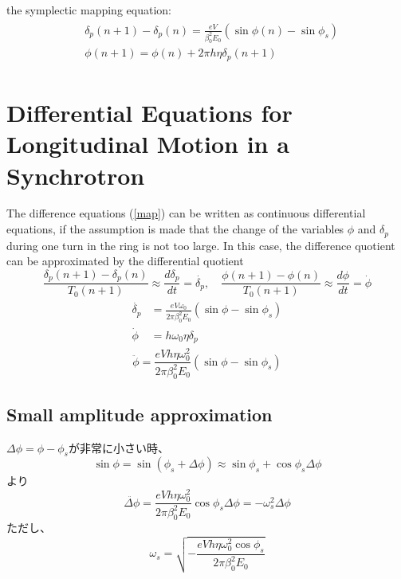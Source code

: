 \documentclass[10pt,a4paper]{ltjsarticle}
\begin{document}
the symplectic mapping equation:
%
\begin{align}
    \begin{split}
        &\delta_p(n+1) - \delta_p(n) = \frac{e V}{\beta_0^2 E_0}(\sin\phi(n) -\sin\phi_s) \\
        &\phi(n+1) = \phi(n) + 2\pi h \eta \delta_p(n+1)
        \label{map}
    \end{split}
\end{align}
%

\section{Differential Equations for Longitudinal Motion in a Synchrotron}
The difference equations (\ref{map}) can be written as continuous differential equations, if the assumption is made that the change of the variables $\phi$ and $\delta_p$ during one turn in the ring is not too large. In this case, the difference quotient can be approximated by the differential quotient
%
\begin{equation}
    \frac{\delta_p(n+1)-\delta_p(n)}{T_0(n+1)} \approx \frac{d\delta_p}{dt}=\dot{\delta_p},\quad 
    \frac{\phi(n+1)-\phi(n)}{T_0(n+1)} \approx \frac{d\phi}{dt}= \dot{\phi}
\end{equation}
%
\begin{align}
    \begin{split}
        \dot{\delta_p} &= \frac{e V \omega_0}{2\pi \beta_0^2 E_0}(\sin\phi - \sin\phi_s) \\
        \dot{\phi} &= h \omega_0 \eta \delta_p
    \end{split}
\end{align}
%
\begin{equation}
    \ddot{\phi} = \frac{e V h \eta \omega_0^2}{2\pi\beta_0^2 E_0}(\sin\phi-\sin\phi_s)
\end{equation}
%
\subsection{Small amplitude approximation}
$\Delta\phi = \phi - \phi_s$が非常に小さい時、
%
\begin{equation}
    \sin\phi = \sin(\phi_s+\Delta\phi) \approx \sin\phi_s + \cos\phi_s \Delta\phi
\end{equation}
%
より
%
\begin{equation}
    \ddot{\Delta\phi} = \frac{e V h \eta \omega_0^2}{2\pi \beta_0^2 E_0} \cos\phi_s \Delta\phi = - \omega_s^2 \Delta\phi
\end{equation}
%
ただし、
%
\begin{equation}
    \omega_s = \sqrt{-\frac{e V h \eta \omega_0^2 \cos\phi_s}{2\pi \beta_0^2 E_0}}
\end{equation}
%
\end{document}
